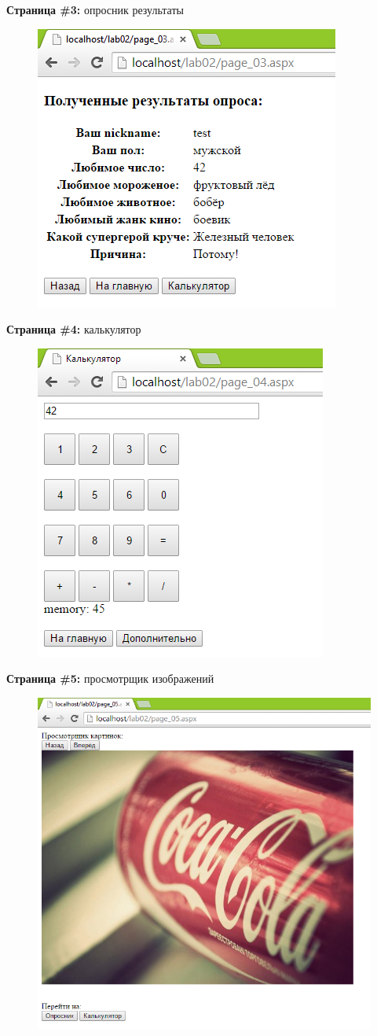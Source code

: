 \documentclass[pscyr]{hedlab}
\begin{document}
  \newpage
  
  \textbf{Страница \#3:} опросник результаты
  \begin{figure}[h!]
    \center
    \includegraphics[width=.47\textwidth]{lab02_03}
  \end{figure}
  
  
  \textbf{Страница \#4:} калькулятор
  \begin{figure}[h!]
    \center
    \includegraphics[width=.47\textwidth]{lab02_04}
  \end{figure}
  
  
  \newpage
  
  \textbf{Страница \#5:} просмотрщик изображений
  \begin{figure}[h!]
    \center
    \includegraphics[width=.47\textwidth]{lab02_05}
  \end{figure}
  
  
\end{document}
